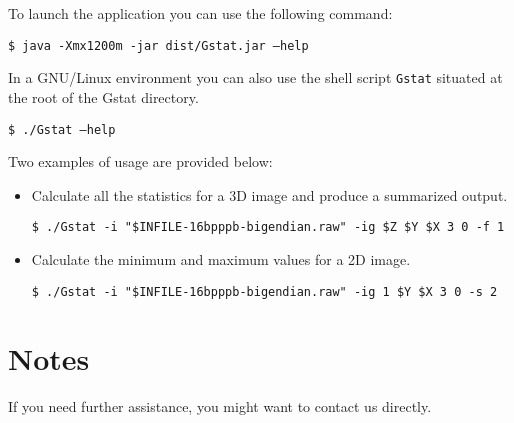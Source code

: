 \documentclass[a4paper,10pt]{article}
\newcommand{\me}{Gstat\relax }
\begin{document}
To launch the application you can use the following command: 

\begin{framed}
\texttt{\$ java -Xmx1200m -jar dist/\me{}.jar --help}
\end{framed}

In a GNU/Linux environment you can also use the shell script \texttt{\me{}} situated at the root of the \me{} directory. 

\begin{framed}
\texttt{\$ ./\me{} --help}
\end{framed}

Two examples of usage are provided below:

\begin{itemize}
\item Calculate all the statistics for a 3D image and produce a summarized output.
\begin{framed}%
\vspace{-1em}%
\begin{verbatim}
$ ./Gstat -i "$INFILE-16bpppb-bigendian.raw" -ig $Z $Y $X 3 0 -f 1 
\end{verbatim}%
\vspace{-1em}%
\end{framed}

\item Calculate the minimum and maximum values for a 2D image.
\begin{framed}%
\vspace{-1em}%
\begin{verbatim}
$ ./Gstat -i "$INFILE-16bpppb-bigendian.raw" -ig 1 $Y $X 3 0 -s 2
\end{verbatim}%
\vspace{-1em}%
\end{framed}
\end{itemize}

\section{Notes}

If you need further assistance, you might want to contact us directly.
\end{document}
